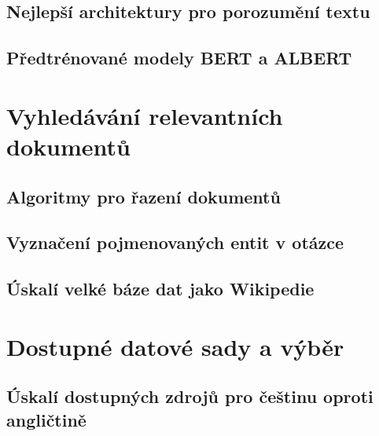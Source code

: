 \section{Nejlepší architektury pro porozumění textu}
\blindtext[8]
\section{Předtrénované modely BERT a ALBERT}
\blindtext[8]





\chapter{Vyhledávání relevantních dokumentů}

\blindtext[2]
\section{Algoritmy pro řazení dokumentů}
\blindtext[8]
\section{Vyznačení pojmenovaných entit v otázce}
\blindtext[8]
\section{Úskalí velké báze dat jako Wikipedie}
\blindtext[4]



\chapter{Dostupné datové sady a výběr}

\blindtext[2]
\section{Úskalí dostupných zdrojů pro češtinu oproti angličtině}
\blindtext[6]

